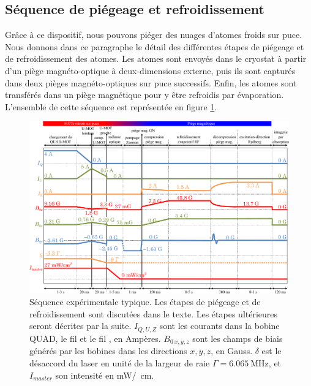 	\subsection{Séquence de piégeage et refroidissement}\label{subsec:exp_seq}
	
\noindent Grâce à ce dispositif, nous pouvons piéger des nuages d'atomes froids sur puce.
Nous donnons dans ce paragraphe le détail des différentes étapes de piégeage et de refroidissement des atomes.
Les atomes sont envoyés dans le cryostat à partir d'un piège magnéto-optique à deux-dimensions externe, puis ils sont capturés dans deux pièges magnéto-optiques sur puce successifs.
Enfin, les atomes sont transférés dans un piège magnétique pour y être refroidis par évaporation.
L'ensemble de cette séquence est représentée en figure \ref{fig:exp_sequence}.
%	
\begin{figure}
\centering
\includegraphics[width=\linewidth]{figures/setup/coldatoms/exp_sequence}
\caption[Séquence expérimentale typique]{Séquence expérimentale typique.%
Les étapes de piégeage et de refroidissement sont %
discutées dans le texte.
Les étapes ultérieures seront décrites par la suite.
$I_{Q,U,Z}$ sont les courants dans la bobine QUAD, le fil  et le fil , en Ampères.
$B_{0~x,y,z}$ sont les champs de biais générés par les bobines dans les directions $x,y,z$, en Gauss.
$\delta$ est le désaccord du laser en unité de la largeur de raie $\Gamma=\SI{6.065}{\MHz}$, et $I_{master}$ son intensité en \si[per-mode=symbol]{\milli\watt \per\squared\cm}.
}
\label{fig:exp_sequence}
\end{figure}


